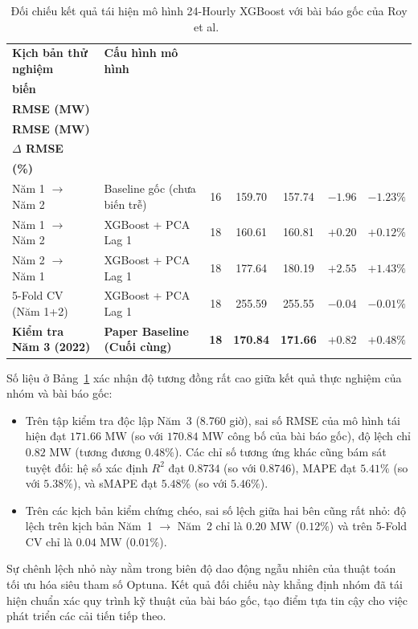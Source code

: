 \begin{table}[H]
\centering
\footnotesize
{}
\caption{Đối chiếu kết quả tái hiện mô hình 24-Hourly XGBoost với bài báo gốc của Roy et al.~\cite{roy2025hourly}}
\label{tab:replication_comparison}
\setlength{\tabcolsep}{3.2pt}
\renewcommand{\arraystretch}{1.15}
\begin{tabularx}{\linewidth}{@{} l >{\RaggedRight\arraybackslash}X c c c c c @{}}
\toprule
\textbf{Kịch bản thử nghiệm} & \textbf{Cấu hình mô hình} & \makecell{\textbf{Số}\\\textbf{biến}} & \makecell{\textbf{Bài báo gốc}\\\textbf{RMSE (MW)}} & \makecell{\textbf{Nhóm tái hiện}\\\textbf{RMSE (MW)}} & \makecell{\textbf{Độ lệch}\\\textbf{$\Delta$ RMSE}} & \makecell{\textbf{Tỷ lệ lệch}\\\textbf{(\%)}} \\
\midrule
Năm 1 $\to$ Năm 2 & Baseline gốc (chưa biến trễ) & 16 & 159.70 & 157.74 & $-1.96$ & $-1.23\%$ \\
Năm 1 $\to$ Năm 2 & XGBoost + PCA Lag 1 & 18 & 160.61 & 160.81 & $+0.20$ & $+0.12\%$ \\
Năm 2 $\to$ Năm 1 & XGBoost + PCA Lag 1 & 18 & 177.64 & 180.19 & $+2.55$ & $+1.43\%$ \\
5-Fold CV (Năm 1+2) & XGBoost + PCA Lag 1 & 18 & 255.59 & 255.55 & $-0.04$ & $-0.01\%$ \\
\midrule
\textbf{Kiểm tra Năm 3 (2022)} & \textbf{Paper Baseline (Cuối cùng)} & \textbf{18} & \textbf{170.84} & \textbf{171.66} & \textbf{$+0.82$} & \textbf{$+0.48\%$} \\
\bottomrule
\end{tabularx}
\end{table}

Số liệu ở Bảng~\ref{tab:replication_comparison} xác nhận độ tương đồng rất cao giữa kết quả thực nghiệm của nhóm và bài báo gốc:
\begin{itemize}
    \item Trên tập kiểm tra độc lập Năm~3 (8.760 giờ), sai số RMSE của mô hình tái hiện đạt $171.66\text{ MW}$ (so với $170.84\text{ MW}$ công bố của bài báo gốc), độ lệch chỉ $0.82\text{ MW}$ (tương đương $0.48\%$). Các chỉ số tương ứng khác cũng bám sát tuyệt đối: hệ số xác định $R^2$ đạt $0.8734$ (so với $0.8746$), MAPE đạt $5.41\%$ (so với $5.38\%$), và sMAPE đạt $5.48\%$ (so với $5.46\%$).
    \item Trên các kịch bản kiểm chứng chéo, sai số lệch giữa hai bên cũng rất nhỏ: độ lệch trên kịch bản Năm~1 $\to$ Năm~2 chỉ là $0.20\text{ MW}$ ($0.12\%$) và trên 5-Fold CV chỉ là $0.04\text{ MW}$ ($0.01\%$).
\end{itemize}
Sự chênh lệch nhỏ này nằm trong biên độ dao động ngẫu nhiên của thuật toán tối ưu hóa siêu tham số Optuna. Kết quả đối chiếu này khẳng định nhóm đã tái hiện chuẩn xác quy trình kỹ thuật của bài báo gốc, tạo điểm tựa tin cậy cho việc phát triển các cải tiến tiếp theo.

